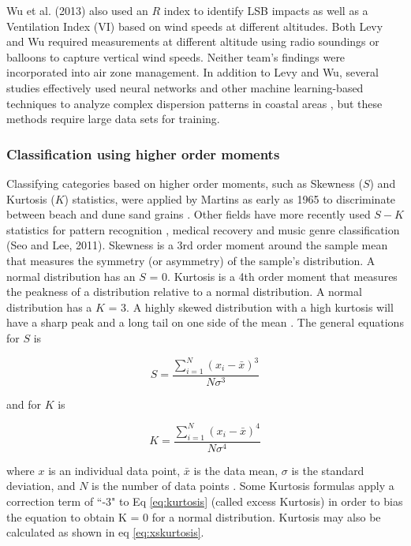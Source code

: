 Wu et al. (2013) also used an $R$ index to identify LSB impacts as well as a Ventilation Index (VI) based on wind speeds at different altitudes.  Both Levy and Wu required measurements at different altitude using radio soundings or balloons to capture vertical wind speeds.  Neither team’s findings were incorporated into air zone management.  In addition to Levy and Wu, several studies effectively used neural networks and other machine learning-based techniques to analyze complex dispersion patterns in coastal areas \citep{Elangasinghe2014, Feng2015}, but these methods require large data sets for training. 

\subsubsection{Classification using higher order moments}
Classifying categories based on higher order moments, such as Skewness ($S$) and Kurtosis ($K$) statistics, were applied by Martins as early as 1965 to discriminate between beach and dune sand grains \citep{Martins1965}.  Other fields have more recently used $S-K$ statistics for pattern recognition \citep{Crosilla2013}, medical recovery \citep{Chi2008} and music genre classification (Seo and Lee, 2011).  Skewness is a 3rd order moment around the sample mean that measures the symmetry (or asymmetry) of the sample’s distribution. A normal distribution has an $S$ = 0. Kurtosis is a 4th order moment that measures the peakness of a distribution relative to a normal distribution. A normal distribution has a $K$ = 3. A highly skewed distribution with a high kurtosis will have a sharp peak and a long tail on one side of the mean \citep{NIST2013}.  The general equations for $S$ is

\begin{equation}
\label{eq:skewness}
S = \frac{\sum_{i=1}^{N}\left (x_{i}-\bar{x} \right )^{3}}{N\sigma^{3}}
\end{equation}

\noindent
and for $K$ is 

\begin{equation}
\label{eq:kurtosis}
K = \frac{\sum_{i=1}^{N}\left (x_{i}-\bar{x} \right )^{4}}{N\sigma^{4}}
\end{equation}

\noindent
where $x$ is an individual data point, $\bar{x}$ is the data mean, $\sigma$ is the standard deviation, and $N$ is the number of data points \citep{Cristelli2012}.    Some Kurtosis formulas apply a correction term of ``-3" to Eq \ref{eq:kurtosis} (called excess Kurtosis) in order to bias the equation to obtain K = 0 for a normal distribution.  Kurtosis may also be calculated as shown in eq \ref{eq:xskurtosis}.

